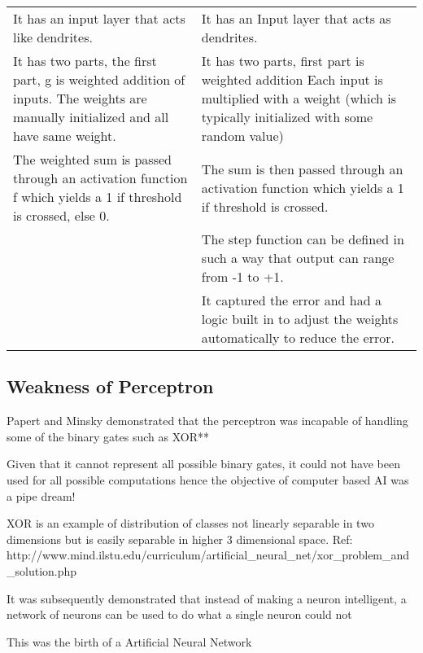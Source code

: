 	\begin{tabular}{|p{0.5\qandatextwidth-2\tabcolsep}|p{0.5\qandatextwidth-2\tabcolsep}|} \hline
			\tablecolumnheadervlinesone{McCulloch-Pitts Neuron} & \tablecolumnheadervlinestwo{Rosenblatt's Perceptron} \\ \hline
			It has an input layer that acts like dendrites. &
			It has an Input layer that acts as dendrites. \\ \hline
			It has two parts, the first part, g is weighted addition of inputs. The weights are manually initialized and all have same weight. &
			It has two parts, first part is weighted addition Each input is multiplied with a weight (which is typically initialized with some random value) \\ \hline
			The weighted sum is passed through an activation function f which yields a 1 if threshold is crossed, else 0. &
			The sum is then passed through an activation function which yields a 1 if threshold is crossed. \\ \hline
			&
			The step function can be defined in such a way that output can range from -1 to +1. \\ \hline
			&
			It captured the error and had a logic built in to adjust the weights automatically to reduce the error. \\ \hline
	\end{tabular}

	\subsection{Weakness of Perceptron}
	\begin{bulletedlist}
		\item Papert and Minsky demonstrated that the perceptron was incapable of handling some of the binary gates such as XOR**
		\item Given that it cannot represent all possible binary gates, it could not have been used for all possible computations hence the objective of computer based AI was a pipe dream!
		\item XOR is an example of distribution of classes not linearly separable in two dimensions but is easily separable in higher 3 dimensional space. Ref: http://www.mind.ilstu.edu/curriculum/artificial\_neural\_net/xor\_problem\_and\_solution.php
		\item It was subsequently demonstrated that instead of making a neuron intelligent, a network of neurons can be used to do what a single neuron could not
		\item This was the birth of a Artificial Neural Network
	\end{bulletedlist}

